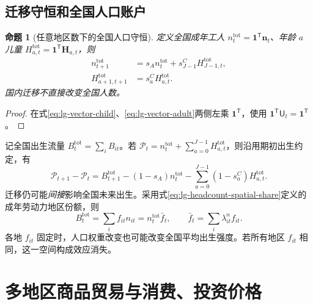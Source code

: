 \documentclass[UTF8,a4paper,zihao=-4,fontset=windows]{ctexart}
\numberwithin{equation}{section}
\newcommand{\ones}{\bm{1}}
\newtheorem{proposition}{命题}[section]
\begin{document}
\subsection{迁移守恒和全国人口账户}
\begin{proposition}[任意地区数下的全国人口守恒]
定义全国成年工人 $n_t^{\mathrm{tot}}=\ones^{\mathsf T}\bm n_t$、年龄 $a$ 儿童 $H_{a,t}^{\mathrm{tot}}=\ones^{\mathsf T}\bm H_{a,t}$，则
\begin{align}
 n_{t+1}^{\mathrm{tot}}&=s_An_t^{\mathrm{tot}}+s^C_{J-1}H_{J-1,t}^{\mathrm{tot}},\\
 H_{a+1,t+1}^{\mathrm{tot}}&=s^C_aH_{a,t}^{\mathrm{tot}}.
 \label{eq:lg-national-pop}
\end{align}
国内迁移不直接改变全国人数。
\end{proposition}
\begin{proof}
在式\eqref{eq:lg-vector-child}、\eqref{eq:lg-vector-adult}两侧左乘 $\ones^{\mathsf T}$，使用 $\ones^{\mathsf T}\mathsf U_t=\ones^{\mathsf T}$。
\end{proof}
记全国出生流量 $B_t^{\mathrm{tot}}=\sum_iB_{it}$。若 $\mathcal P_t=n_t^{\mathrm{tot}}+\sum_{a=0}^{J-1}H_{a,t}^{\mathrm{tot}}$，则沿用期初出生约定，有
\begin{equation}
 \mathcal P_{t+1}-\mathcal P_t=B_{t+1}^{\mathrm{tot}}
 -(1-s_A)n_t^{\mathrm{tot}}-\sum_{a=0}^{J-1}(1-s^C_a)H_{a,t}^{\mathrm{tot}}.
 \label{eq:lg-total-pop-account}
\end{equation}
迁移仍可能\emph{间接}影响全国未来出生。采用式\eqref{eq:lg-headcount-spatial-share}定义的成年劳动力地区份额，则
\begin{equation}
 B_t^{\mathrm{tot}}=\sum_i f_{it}n_{it}
 =n_t^{\mathrm{tot}}\bar f_t,\qquad
 \bar f_t=\sum_i\lambda^n_{it}f_{it}.
 \label{eq:lg-composition-fertility}
\end{equation}
各地 $f_{it}$ 固定时，人口权重改变也可能改变全国平均出生强度。若所有地区 $f_{it}$ 相同，这一空间构成效应消失。

\section{多地区商品贸易与消费、投资价格}
\label{sec:lg-trade}
\end{document}
